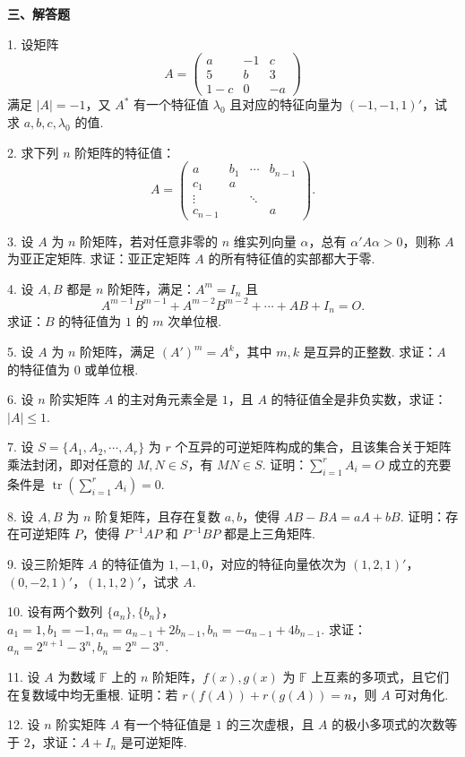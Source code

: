 \documentclass[UTF8, 12pt, fontset=fandol, oneside]{ctexart}
\begin{document}
\noindent\textbf{三、解答题}

1. 设矩阵
\[
A=\begin{pmatrix}a&-1&c\\5&b&3\\1-c&0&-a\end{pmatrix}
\]
满足 $|A|=-1$，又 $A^*$ 有一个特征值 $\lambda_0$ 且对应的特征向量为 $(-1,-1,1)'$，试求 $a,b,c,\lambda_0$ 的值.

2. 求下列 $n$ 阶矩阵的特征值：
\[
A=
\begin{pmatrix}
a&b_1&\cdots&b_{n-1}\\
c_1&a&&\\
\vdots&&\ddots&\\
c_{n-1}&&&a
\end{pmatrix}.
\]

3. 设 $A$ 为 $n$ 阶矩阵，若对任意非零的 $n$ 维实列向量 $\alpha$，总有 $\alpha'A\alpha>0$，则称 $A$ 为亚正定矩阵. 求证：亚正定矩阵 $A$ 的所有特征值的实部都大于零.

4. 设 $A,B$ 都是 $n$ 阶矩阵，满足：$A^m=I_n$ 且
\[
A^{m-1}B^{m-1}+A^{m-2}B^{m-2}+\cdots+AB+I_n=O.
\]
求证：$B$ 的特征值为 $1$ 的 $m$ 次单位根.

5. 设 $A$ 为 $n$ 阶矩阵，满足 $(A')^m=A^k$，其中 $m,k$ 是互异的正整数. 求证：$A$ 的特征值为 $0$ 或单位根.

6. 设 $n$ 阶实矩阵 $A$ 的主对角元素全是 $1$，且 $A$ 的特征值全是非负实数，求证：$|A|\le 1$.

7. 设 $S=\{A_1,A_2,\cdots,A_r\}$ 为 $r$ 个互异的可逆矩阵构成的集合，且该集合关于矩阵乘法封闭，即对任意的 $M,N\in S$，有 $MN\in S$. 证明：$\sum_{i=1}^rA_i=O$ 成立的充要条件是 $\operatorname{tr}(\sum_{i=1}^rA_i)=0$.

8. 设 $A,B$ 为 $n$ 阶复矩阵，且存在复数 $a,b$，使得 $AB-BA=aA+bB$. 证明：存在可逆矩阵 $P$，使得 $P^{-1}AP$ 和 $P^{-1}BP$ 都是上三角矩阵.

9. 设三阶矩阵 $A$ 的特征值为 $1,-1,0$，对应的特征向量依次为 $(1,2,1)'$，$(0,-2,1)'$，$(1,1,2)'$，试求 $A$.

10. 设有两个数列 $\{a_n\},\{b_n\}$，$a_1=1,b_1=-1,a_n=a_{n-1}+2b_{n-1},b_n=-a_{n-1}+4b_{n-1}$. 求证：$a_n=2^{n+1}-3^n,b_n=2^n-3^n$.

11. 设 $A$ 为数域 $\mathbb{F}$ 上的 $n$ 阶矩阵，$f(x),g(x)$ 为 $\mathbb{F}$ 上互素的多项式，且它们在复数域中均无重根. 证明：若 $r(f(A))+r(g(A))=n$，则 $A$ 可对角化.

12. 设 $n$ 阶实矩阵 $A$ 有一个特征值是 $1$ 的三次虚根，且 $A$ 的极小多项式的次数等于 $2$，求证：$A+I_n$ 是可逆矩阵.
\end{document}
